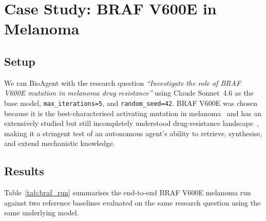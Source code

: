 \documentclass[11pt]{article}
\begin{document}
\section{Case Study: BRAF V600E in Melanoma}

\subsection{Setup}
We ran BioAgent with the research question
\emph{``Investigate the role of BRAF V600E mutation in melanoma drug resistance''}
using Claude Sonnet~4.6 as the base model,
\texttt{max\_iterations=5}, and \texttt{random\_seed=42}.
BRAF V600E was chosen because it is the best-characterised activating
mutation in melanoma~\cite{Davies2002,Flaherty2010} and has an
extensively studied but still incompletely understood drug-resistance
landscape~\cite{Sosman2012}, making it a stringent test of an
autonomous agent's ability to retrieve, synthesise, and extend
mechanistic knowledge.

\subsection{Results}

Table~\ref{tab:braf_run} summarises the end-to-end BRAF V600E melanoma
run against two reference baselines evaluated on the same research
question using the same underlying model.
\end{document}
